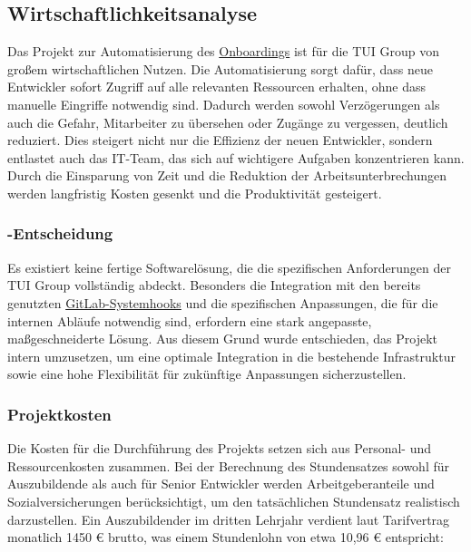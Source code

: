 \subsection{Wirtschaftlichkeitsanalyse}
\label{sec:Wirtschaftlichkeitsanalyse}

Das Projekt zur Automatisierung des \hyperlink{Onboarding}{\textcolor{AOBlau}{Onboardings}} ist für die TUI Group von großem wirtschaftlichen Nutzen. Die Automatisierung sorgt dafür, dass neue Entwickler sofort Zugriff auf alle relevanten Ressourcen erhalten, ohne dass manuelle Eingriffe notwendig sind. Dadurch werden sowohl Verzögerungen als auch die Gefahr, Mitarbeiter zu übersehen oder Zugänge zu vergessen, deutlich reduziert. Dies steigert nicht nur die Effizienz der neuen Entwickler, sondern entlastet auch das IT-Team, das sich auf wichtigere Aufgaben konzentrieren kann. Durch die Einsparung von Zeit und die Reduktion der Arbeitsunterbrechungen werden langfristig Kosten gesenkt und die Produktivität gesteigert.

\subsubsection{-Entscheidung}
\label{sec:MakeOrBuyEntscheidung}

Es existiert keine fertige Softwarelösung, die die spezifischen Anforderungen der TUI Group vollständig abdeckt. Besonders die Integration mit den bereits genutzten \hyperlink{GitLabSystemHooks}{\textcolor{AOBlau}{GitLab-Systemhooks}} und die spezifischen Anpassungen, die für die internen Abläufe notwendig sind, erfordern eine stark angepasste, maßgeschneiderte Lösung. Aus diesem Grund wurde entschieden, das Projekt intern umzusetzen, um eine optimale Integration in die bestehende Infrastruktur sowie eine hohe Flexibilität für zukünftige Anpassungen sicherzustellen.

\subsubsection{Projektkosten}
\label{sec:Projektkosten}

Die Kosten für die Durchführung des Projekts setzen sich aus Personal- und Ressourcenkosten zusammen. Bei der Berechnung des Stundensatzes sowohl für Auszubildende als auch für Senior Entwickler werden Arbeitgeberanteile und Sozialversicherungen berücksichtigt, um den tatsächlichen Stundensatz realistisch darzustellen.
\newline
Ein Auszubildender im dritten Lehrjahr verdient laut Tarifvertrag monatlich 1450 € brutto, was einem Stundenlohn von etwa 10,96 € entspricht:

